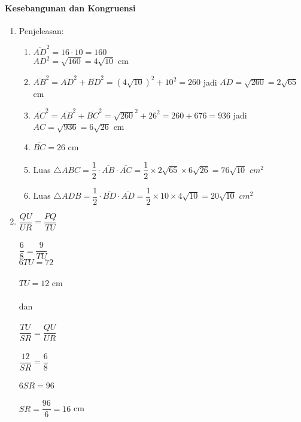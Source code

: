 \documentclass[12pt,a4paper]{article}
\begin{document}
		\paragraph{Kesebangunan dan Kongruensi}
	\begin{enumerate}
		\item Penjeleasan:
		\begin{enumerate}
			\item $\overline{AD}^2=16 \cdot 10=160$\\	
			$AD^2=\sqrt{160}=4\sqrt{10}$ cm
			\item $\overline{AB}^2=\overline{AD}^2+ \overline{BD}^2=(4\sqrt{10})^2 + 10^2=260$ jadi $\overline{AD}=\sqrt{260}=2\sqrt{65}$ cm
			\item $\overline{AC}^2=\overline{AB}^2+ \overline{BC}^2=\sqrt{260}^2+26^2=260+676=936$ jadi $AC=\sqrt{936}=6\sqrt{26}$ cm
			\item $\overline{BC}=26$ cm
			\item Luas $\triangle ABC=\dfrac{1}{2}\cdot \overline{AB} \cdot \overline{AC}=\dfrac{1}{2}\times 2\sqrt{65} \times 6\sqrt{26}= 76\sqrt{10}$ $cm^2$
			\item Luas $\triangle ADB=\dfrac{1}{2}\cdot \overline{BD} \cdot \overline{AD}=\dfrac{1}{2}\times 10 \times 4\sqrt{10}= 20\sqrt{10}$ $cm^2$
		\end{enumerate}
		\item $\dfrac{QU}{UR}=\dfrac{PQ}{TU}$\\
		\\
		$\dfrac{6}{8}=\dfrac{9}{TU}$
		\\
		$6TU=72$\\
		\\
		$TU=12$ cm\\
		\\
		dan \\
		\\
		$\dfrac{TU}{SR}=\dfrac{QU}{UR}$\\
		\\
		$\dfrac{12}{SR}=\dfrac{6}{8}$\\
		\\
		$6SR=96$\\
		\\
		$SR=\dfrac{96}{6}=16$ cm
		

\end{enumerate}
\end{document}
